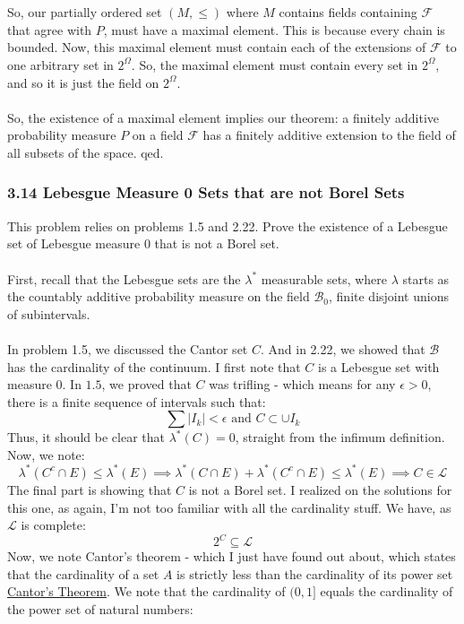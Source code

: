 \documentclass[12pt,a4paper]{article}
\newcommand{\1}[1]{\mathbbm{1}\left\{ #1 \right\}}
\newcommand{\lcal}{\mathcal{L}}
\newcommand{\fcal}{\mathcal{F}}
\newcommand{\bcal}{\mathcal{B}}
\begin{document}
\\\\
So, our partially ordered set $(M,\leq)$ where $M$ contains fields containing $\fcal$ that agree with $P$, must have a maximal element. This is because every chain is bounded. Now, this maximal element must contain each of the extensions of $\fcal$ to one arbitrary set in $2^\Omega$. So, the maximal element must contain every set in $2^\Omega$, and so it is just the field on $2^\Omega$.
\\\\
So, the existence of a maximal element implies our theorem: a finitely additive probability measure $P$ on a field $\fcal$ has a finitely additive extension to the field of all subsets of the space. qed.

\subsubsection{3.14 Lebesgue Measure 0 Sets that are not Borel Sets} This problem relies on problems 1.5 and 2.22. Prove the existence of a Lebesgue set of Lebesgue measure $0$ that is not a Borel set.
\\\\
First, recall that the Lebesgue sets are the $\lambda^*$ measurable sets, where $\lambda$ starts as the countably additive probability measure on the field $\bcal_0$, finite disjoint unions of subintervals.
\\\\
In problem 1.5, we discussed the Cantor set $C$. And in 2.22, we showed that $\bcal$ has the cardinality of the continuum. I first note that $C$ is a Lebesgue set with measure $0$. In $1.5$, we proved that $C$ was trifling - which means for any $\epsilon > 0$, there is a finite sequence of intervals such that:
$$
	\sum |I_k| < \epsilon \text{ and } C \subset \cup I_k
$$
Thus, it should be clear that $\lambda^*(C) = 0$, straight from the infimum definition. Now, we note:
$$
	\lambda^*(C^c \cap E) \leq \lambda^*(E) \implies
	\lambda^*(C \cap E) + \lambda^*(C^c \cap E) \leq \lambda^*(E) \implies
	C \in \lcal
$$
The final part is showing that $C$ is not a Borel set. I realized on the solutions for this one, as again, I'm not too familiar with all the cardinality stuff. We have, as $\lcal$ is complete:
$$
	2^C \subseteq \lcal
$$
Now, we note Cantor's theorem - which I just have found out about, which states that the cardinality of a set $A$ is strictly less than the cardinality of its power set \href{https://en.wikipedia.org/wiki/Cantor%27s_theorem}{Cantor's Theorem}. We note that the cardinality of $(0,1]$ equals the cardinality of the power set of natural numbers:
\end{document}
